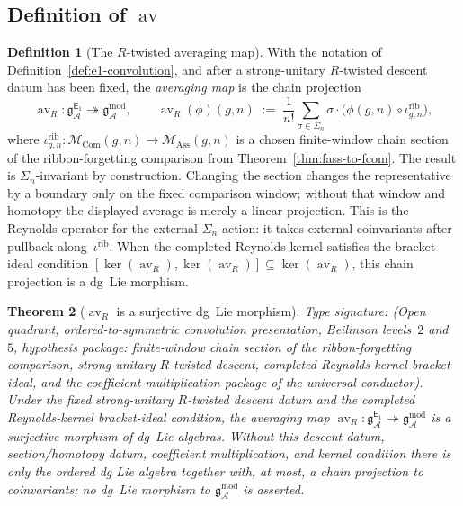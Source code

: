 \documentclass[11pt,reqno]{amsart}
\newtheorem{theorem}{Theorem}[section]
\theoremstyle{definition}
\newtheorem{definition}[theorem]{Definition}
\theoremstyle{remark}
\newcommand{\cA}{\mathcal{A}}
\newcommand{\cM}{\mathcal{M}}
\newcommand{\Eone}{\mathsf{E}_{1}}
\newcommand{\Ass}{\mathrm{Ass}}
\newcommand{\Com}{\mathrm{Com}}
\DeclareMathOperator{\av}{av}
\newcommand{\gmod}{\mathfrak{g}^{\mathrm{mod}}_{\cA}}
\newcommand{\gEone}{\mathfrak{g}^{\Eone}_{\cA}}
\numberwithin{equation}{section}
\begin{document}
\subsection{Definition of $\av$}

\begin{definition}[The \(R\)-twisted averaging map]
\label{def:averaging-map}
With the notation of Definition~\ref{def:e1-convolution}, and after a
strong-unitary \(R\)-twisted descent datum has been fixed, the
\emph{averaging map} is the chain projection
\begin{equation}\label{eq:av-def}
  \av_R\colon \gEone \twoheadrightarrow \gmod,
  \qquad
  \av_R(\phi)(g,n)
  \;:=\;
  \frac{1}{n!}\sum_{\sigma \in \Sigma_n}
  \sigma \cdot
  \bigl(\phi(g,n) \circ \iota^{\mathrm{rib}}_{g,n}\bigr),
\end{equation}
where
$\iota^{\mathrm{rib}}_{g,n}\colon \cM_\Com(g,n)
\to \cM_\Ass(g,n)$
is a chosen finite-window chain section of the ribbon-forgetting
comparison from Theorem~\ref{thm:fass-to-fcom}. The result is
$\Sigma_n$-invariant by construction. Changing the section changes
the representative by a boundary only on the fixed comparison window;
without that window and homotopy the displayed average is merely a
linear projection. This is the Reynolds operator for the external
$\Sigma_n$-action: it takes external coinvariants after pullback
along~$\iota^{\mathrm{rib}}$.
When the completed Reynolds kernel satisfies the bracket-ideal
condition $[\ker(\av_R),\ker(\av_R)]\subseteq\ker(\av_R)$, this chain
projection is a dg~Lie morphism.
\end{definition}

\begin{theorem}[$\av_R$ is a surjective dg~Lie morphism]
\label{thm:av-surjective}
\ClaimStatusConditional
Type signature: \textup{(}Open quadrant, ordered-to-symmetric
convolution presentation, Beilinson levels~$2$ and~$5$, hypothesis
package: finite-window chain section of the ribbon-forgetting
comparison, strong-unitary \(R\)-twisted descent, completed
Reynolds-kernel bracket ideal, and the coefficient-multiplication
package of the universal conductor\textup{)}.
Under the fixed strong-unitary \(R\)-twisted descent datum and the
completed Reynolds-kernel bracket-ideal condition, the averaging map
$\av_R\colon \gEone \twoheadrightarrow \gmod$
is a surjective morphism of dg~Lie algebras. Without this descent
datum, section/homotopy datum, coefficient multiplication, and kernel
condition there is only the ordered dg Lie algebra together with, at
most, a chain projection to coinvariants; no dg~Lie morphism to
\(\gmod\) is asserted.
\end{theorem}
\end{document}
